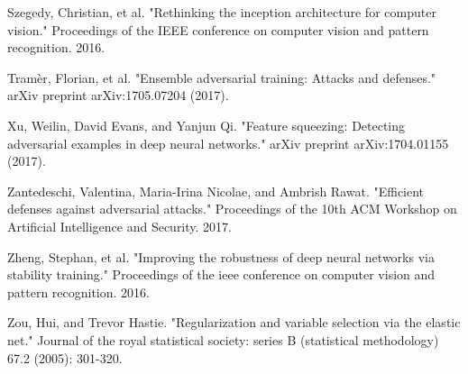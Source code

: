 \begin{thebibliography}{9}
	\bibitem{}
	Szegedy, Christian, et al. "Rethinking the inception architecture for computer vision." Proceedings of the IEEE conference on computer vision and pattern recognition. 2016.
	
	\bibitem{}
	Tramèr, Florian, et al. "Ensemble adversarial training: Attacks and defenses." arXiv preprint arXiv:1705.07204 (2017).
	
	\bibitem{}
	Xu, Weilin, David Evans, and Yanjun Qi. "Feature squeezing: Detecting adversarial examples in deep neural networks." arXiv preprint arXiv:1704.01155 (2017).
	
	\bibitem{}
	Zantedeschi, Valentina, Maria-Irina Nicolae, and Ambrish Rawat. "Efficient defenses against adversarial attacks." Proceedings of the 10th ACM Workshop on Artificial Intelligence and Security. 2017.
	
	\bibitem{}
	Zheng, Stephan, et al. "Improving the robustness of deep neural networks via stability training." Proceedings of the ieee conference on computer vision and pattern recognition. 2016.
	
	\bibitem{}
	Zou, Hui, and Trevor Hastie. "Regularization and variable selection via the elastic net." Journal of the royal statistical society: series B (statistical methodology) 67.2 (2005): 301-320.
\end{thebibliography}